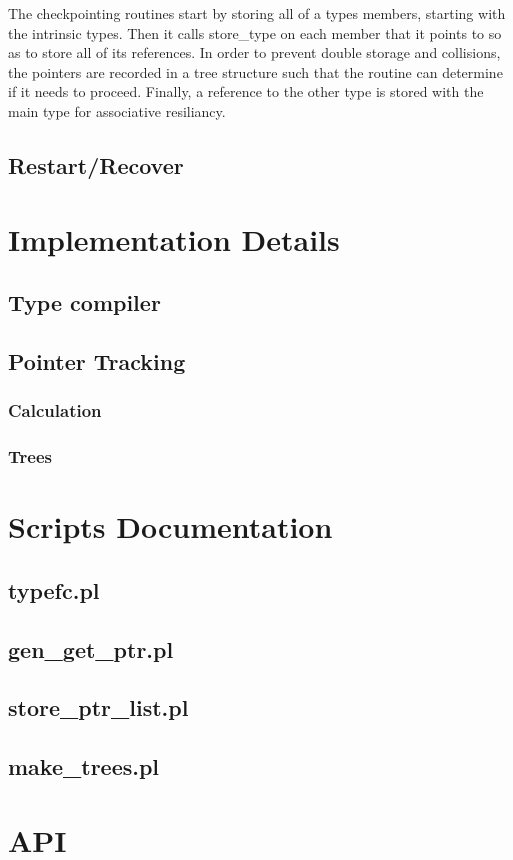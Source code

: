 \documentclass{article}
\begin{document}
The checkpointing routines start by storing all of a types members, starting with the intrinsic types. Then it calls store\_type on each member that it points to so as to store all of its references. In order to prevent double storage and collisions, the pointers are recorded in a tree structure such that the routine can determine if it needs to proceed. Finally, a reference to the other type is stored with the main type for associative resiliancy.

\subsection{Restart/Recover}
\section{Implementation Details}
\subsection{Type compiler}
\subsection{Pointer Tracking}
\subsubsection{Calculation}
\subsubsection{Trees}
\section{Scripts Documentation}
\subsection{typefc.pl}
\subsection{gen\_get\_ptr.pl}
\subsection{store\_ptr\_list.pl}
\subsection{make\_trees.pl}
\section{API}
\end{document}
